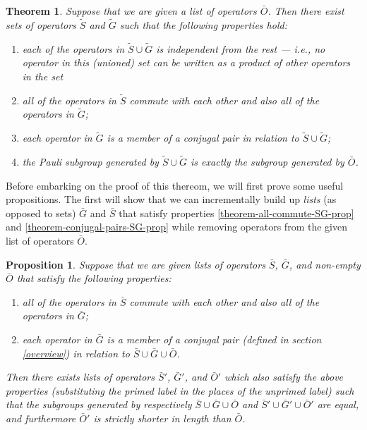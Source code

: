 \documentclass[twocolumn,showpacs,preprintnumbers,amsmath,amssymb,nofootinbib,pra,floatfix]{revtex4}
\newtheorem{theorem}{Theorem}
\newtheorem{proposition}{Proposition}
\newenvironment{remark}[1][Remark]{\begin{trivlist}
\item[\hskip \labelsep {\bfseries #1}]}{\end{trivlist}}
\begin{document}
\label{stabilizers-and-gauge-qubits}
\begin{theorem} \label{theorem-SG} Suppose that we are given a list of operators $\bar O$.  Then there exist sets of operators $\tilde S$ and $\tilde G$ such that the following properties hold:
\begin{enumerate}
\item each of the operators in $\tilde S \cup \tilde G$ is
  independent from the rest --- i.e., no operator in this (unioned) set can
  be written as a product of other operators in the set
\item \label{theorem-all-commute-SG-prop} all of the operators in $\tilde S$ commute with each other and
  also all of the operators in $\tilde G$;
\item \label{theorem-conjugal-pairs-SG-prop} each operator in $\tilde G$ is a member of a conjugal pair in relation to $\tilde S \cup \tilde G$;
\item \label{theorem-complete-SG-prop} the Pauli subgroup generated by $\tilde S \cup \tilde G$ is exactly
  the subgroup generated by $\bar O$.
\end{enumerate}
\end{theorem}
\begin{remark}
Before embarking on the proof of this thereom, we will first prove some useful propositions.  The first will show that we can incrementally build up \emph{lists} (as opposed to sets) $\bar G$ and $\bar S$ that satisfy properties \ref{theorem-all-commute-SG-prop} and \ref{theorem-conjugal-pairs-SG-prop} while removing operators from the given list of operators $\bar O$.
\end{remark}

\begin{proposition} \label{proposition-SG} Suppose that we are given lists of operators $\bar S$, $\bar G$, and non-empty $\bar O$ that satisfy the following properties:
\begin{enumerate}
\item all of the operators in $\bar S$ commute with each other and also all of the operators in $\bar G$; \label{stabs-commute-with-G}
\item each operator in $\bar G$ is a member of a \emph{conjugal pair} (defined in section \ref{overview}) in relation to $\bar S \cup \bar G \cup \bar O$. \label{conjugal-pairs-commute-with-SAG}
\end{enumerate}
Then there exists lists of operators $\bar S'$, $\bar G'$, and $\bar O'$ which also satisfy the above properties (substituting the primed label in the places of the unprimed label) such that the subgroups generated by respectively $\bar S\cup \bar G\cup \bar O$ and $\bar S'\cup \bar G'\cup \bar O'$ are equal, and furthermore $\bar O'$ is strictly shorter in length than $\bar O$.
\end{proposition}
\end{document}
